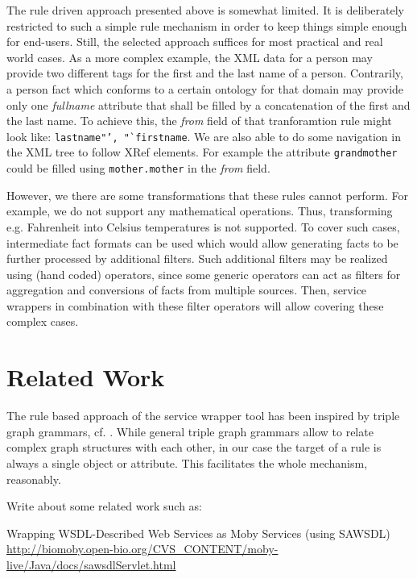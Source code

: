 \documentclass{fast_latex}
\begin{document}
The rule driven approach presented above is somewhat limited. It is deliberately restricted to such a simple rule mechanism in order to keep things simple enough for end-users. Still, the selected approach suffices for most practical and real world cases. As a more complex example, the XML data for a person may provide two different tags for the first and the last name of a person. Contrarily, a person fact which conforms to a certain ontology for that domain may provide only one \emph{fullname} attribute that shall be filled by a concatenation of the first and the last name. To achieve this, the \textit{from} field of that tranforamtion rule might look like: \texttt{lastname"', "`firstname}. We are also able to do some navigation in the XML tree to follow XRef elements. For example the attribute \texttt{grandmother} could be filled using \texttt{mother.mother} in the \textit{from} field. 

However, we there are some transformations that these rules cannot perform. For example, we do not support any mathematical operations. Thus, transforming e.g. Fahrenheit into Celsius temperatures is not supported. To cover such  cases, intermediate fact formats can be used which would allow generating facts to be further processed by additional filters. Such additional filters may be realized using (hand coded) operators, since some generic operators can act as filters for aggregation and conversions of facts from multiple sources. Then, service wrappers in combination with these filter operators will allow covering these complex cases.



\clearpage
\section{Related Work} %
\label{sec:related_work}

The rule based approach of the service wrapper tool has been inspired by triple graph grammars, cf. \cite{conf/wg/Schurr94,JSZ97c}. While general triple graph grammars allow to relate complex graph structures with each other, in our case the target of a rule is always a single object or attribute. This facilitates the whole mechanism, reasonably. 

Write about some related work such as:

Wrapping WSDL-Described Web Services as Moby Services (using SAWSDL)
\url{http://biomoby.open-bio.org/CVS_CONTENT/moby-live/Java/docs/sawsdlServlet.html}
\end{document}
